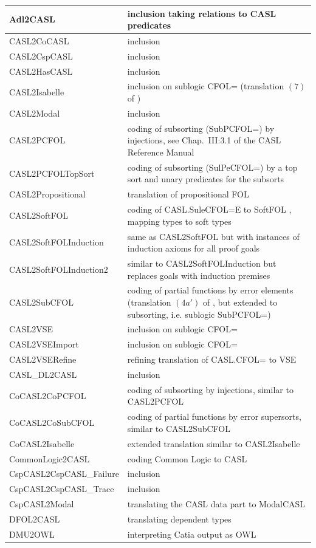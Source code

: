 \documentclass{article}
\begin{document}
\begin{tabular}{|l|p{8cm}|}\hline
Adl2CASL & inclusion taking relations to CASL predicates \\\hline
CASL2CoCASL & inclusion \\\hline
CASL2CspCASL & inclusion \\\hline
CASL2HasCASL & inclusion \\\hline
CASL2Isabelle & inclusion on sublogic CFOL=
(translation $(7)$ of \cite{Mossakowski02}) \\\hline
CASL2Modal & inclusion \\\hline
CASL2PCFOL & coding of subsorting (SubPCFOL=) by injections, see Chap.\ III:3.1 of the CASL Reference Manual \cite{CASL/RefManual} \\\hline
CASL2PCFOLTopSort & coding of subsorting (SulPeCFOL=) by a top sort and unary
predicates for the subsorts \\\hline
CASL2Propositional & translation of propositional FOL \\\hline
CASL2SoftFOL & coding of CASL.SuleCFOL=E to SoftFOL \cite{LuettichEA06a},
mapping types to soft types \\\hline
CASL2SoftFOLInduction & same as CASL2SoftFOL but with instances of induction
axioms for all proof goals \\\hline
CASL2SoftFOLInduction2 & similar to CASL2SoftFOLInduction but replaces goals with induction premises \\\hline
CASL2SubCFOL & coding of partial functions by error elements
(translation $(4a')$ of \cite{Mossakowski02}, but extended to subsorting, i.e. sublogic SubPCFOL=) \\\hline
CASL2VSE & inclusion on sublogic CFOL= \\\hline
CASL2VSEImport & inclusion on sublogic CFOL= \\\hline
CASL2VSERefine & refining translation of CASL.CFOL= to VSE \\\hline
CASL\_DL2CASL & inclusion \\\hline
CoCASL2CoPCFOL & coding of subsorting by injections, similar to CASL2PCFOL \\\hline
CoCASL2CoSubCFOL & coding of partial functions by error supersorts, similar to  CASL2SubCFOL \\\hline
CoCASL2Isabelle & extended translation similar to CASL2Isabelle \\\hline
CommonLogic2CASL & coding Common Logic to CASL \\\hline
CspCASL2CspCASL\_Failure & inclusion \\\hline
CspCASL2CspCASL\_Trace & inclusion \\\hline
CspCASL2Modal & translating the CASL data part to ModalCASL \\\hline
DFOL2CASL & translating dependent types \\\hline
DMU2OWL & interpreting Catia output as OWL \\\hline
\end{tabular}
\end{document}
